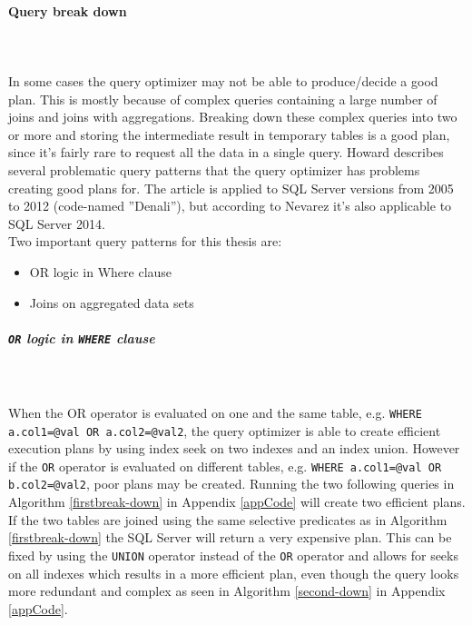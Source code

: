 \documentclass{cslthse-msc}
\begin{document}
\paragraph*{Query break down}\mbox{}\\\\ \label{querybreakdown}
\noindent In some cases the query optimizer may not be able to produce/decide a good plan. This is mostly because of complex queries containing a large number of joins and joins with aggregations. Breaking down these complex queries into two or more and storing the intermediate result in temporary tables is a good plan, since it's fairly rare to request all the data in a single query. 
Howard   \cite{break-down} describes several problematic query patterns that the query optimizer has problems creating good plans for. The article is applied to SQL Server versions from 2005 to 2012 (code-named ''Denali''), but according to Nevarez \cite{Nevarez} it's also applicable to SQL Server 2014.\\ Two important query patterns for this thesis are:
\begin{itemize}
\item OR logic in Where clause
\item Joins on aggregated data sets
\end{itemize}

\subparagraph{\texttt{OR} logic in \texttt{WHERE} clause}\mbox{}\\\\
When the OR operator is evaluated on one and the same table, e.g. \texttt{WHERE a.col1=@val OR a.col2=@val2}, the query optimizer is able to create efficient execution plans by using index seek on two indexes and an index union. However if the \texttt{OR} operator is evaluated on different tables, e.g. \texttt{WHERE a.col1=@val OR b.col2=@val2}, poor plans may be created. Running the two following queries in Algorithm \ref{firstbreak-down} in Appendix \ref{appCode} will create two efficient plans.\\

\noindent If the two tables are joined using the same selective predicates as in Algorithm \ref{firstbreak-down} the SQL Server will return a very expensive plan. This can be fixed by using the \texttt{UNION} operator instead of the \texttt{OR} operator and allows for seeks on all indexes which results in a more efficient plan, even though the query looks more redundant and complex as seen in Algorithm \ref{second-down} in Appendix \ref{appCode}.
\end{document}
